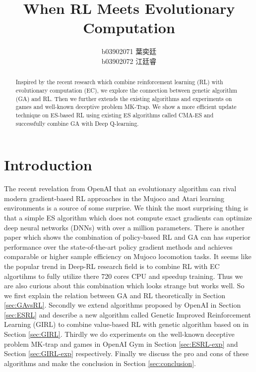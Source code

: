 \documentclass[a4paper]{article}
\title{When RL Meets Evolutionary Computation}
\author{b03902071 \ZhFont 葉奕廷 \\ b03902072 \ZhFont 江廷睿}
\date{}
\begin{document}
\maketitle

\begin{abstract}
Inspired by the recent research which combine reinforcement learning (RL) with evolutionary computation (EC), we explore the connection between genetic algorithm (GA) and RL. Then we further extends the existing algorithms and experiments on games and well-known deceptive problem MK-Trap. We show a more efficient update technique on ES-based RL using existing ES algorithms called CMA-ES and successfully combine GA with Deep Q-learning. 
\end{abstract}

\section{Introduction}

The recent revelation from OpenAI \cite{openes/2017arXiv170303864S} that an evolutionary algorithm can rival modern gradient-based RL approaches in the Mujoco and Atari learning environments is a source of some surprise. We think the most surprising thing is that a simple ES algorithm which does not compute exact gradients can optimize deep neural networks (DNNs) with over a million parameters. There is another paper \cite{DBLP:journals/corr/abs-1711-01012} which shows the combination of policy-based RL and GA can has superior performance over the state-of-the-art policy gradient methods and achieves comparable or higher sample efficiency on Mujoco locomotion tasks. It seems like the popular trend in Deep-RL research field is to combine RL with EC algortihms to fully utilize there 720 cores CPU and speedup training. Thus we are also curious about this combination which looks strange but works well. So we first explain the relation between GA and RL theoretically in Section \ref{sec:GAvsRL}. Secondly we extend algorithms proposed by OpenAI \cite{openes/2017arXiv170303864S} in Section \ref{sec:ESRL} and describe a new algorithm called Genetic Improved Reinforcement Learning (GIRL) to combine value-based RL with genetic algorithm based on \cite{DBLP:journals/corr/abs-1711-01012} in Section \ref{sec:GIRL}. Thirdly we do experiments on the well-known deceptive problem MK-trap and games in OpenAI Gym \cite{gym/2016arXiv160601540B} in Section \ref{sec:ESRL-exp} and Section \ref{sec:GIRL-exp} respectively. Finally we discuss the pro and cons of these algorithms and make the conclusion in Section \ref{sec:conclusion}.
\end{document}
